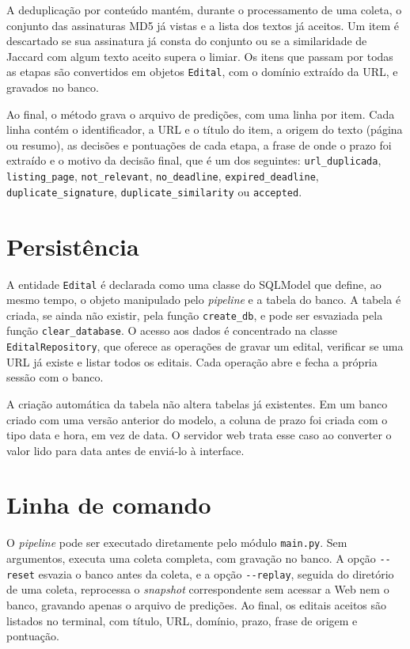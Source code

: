 A deduplicação por conteúdo mantém, durante o processamento de uma coleta, o
conjunto das assinaturas MD5 já vistas e a lista dos textos já aceitos. Um item
é descartado se sua assinatura já consta do conjunto ou se a similaridade de
Jaccard com algum texto aceito supera o limiar. Os itens que passam por todas
as etapas são convertidos em objetos \texttt{Edital}, com o domínio extraído
da URL, e gravados no banco.

Ao final, o método grava o arquivo de predições, com uma linha por item. Cada
linha contém o identificador, a URL e o título do item, a origem do texto
(página ou resumo), as decisões e pontuações de cada etapa, a frase de onde o
prazo foi extraído e o motivo da decisão final, que é um dos seguintes:
\texttt{url\_duplicada}, \texttt{listing\_page}, \texttt{not\_relevant},
\texttt{no\_deadline}, \texttt{expired\_deadline},
\texttt{duplicate\_signature}, \texttt{duplicate\_similarity} ou
\texttt{accepted}.

\section{Persistência}
\label{sec:impl_persistencia}

A entidade \texttt{Edital} é declarada como uma classe do SQLModel que define,
ao mesmo tempo, o objeto manipulado pelo \textit{pipeline} e a tabela do
banco. A tabela é criada, se ainda não existir, pela função \texttt{create\_db},
e pode ser esvaziada pela função \texttt{clear\_database}. O acesso aos dados é
concentrado na classe \texttt{EditalRepository}, que oferece as operações de
gravar um edital, verificar se uma URL já existe e listar todos os editais.
Cada operação abre e fecha a própria sessão com o banco.

A criação automática da tabela não altera tabelas já existentes. Em um banco
criado com uma versão anterior do modelo, a coluna de prazo foi criada com o
tipo data e hora, em vez de data. O servidor web trata esse caso ao converter
o valor lido para data antes de enviá-lo à interface.

\section{Linha de comando}
\label{sec:impl_cli}

O \textit{pipeline} pode ser executado diretamente pelo módulo
\texttt{main.py}. Sem argumentos, executa uma coleta completa, com gravação no
banco. A opção \texttt{-{}-reset} esvazia o banco antes da coleta, e a opção
\texttt{-{}-replay}, seguida do diretório de uma coleta, reprocessa o
\textit{snapshot} correspondente sem acessar a Web nem o banco, gravando
apenas o arquivo de predições. Ao final, os editais aceitos são listados no
terminal, com título, URL, domínio, prazo, frase de origem e pontuação.

